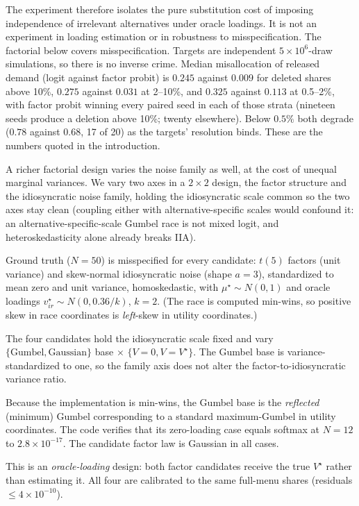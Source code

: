 \documentclass[12pt]{article}
\theoremstyle{remark}
\begin{document}
The experiment
therefore isolates the pure substitution cost of imposing independence
of irrelevant alternatives under oracle loadings. It is not an
experiment in loading estimation or in robustness to misspecification.
The factorial below covers misspecification. Targets are independent
$5\times10^6$-draw simulations, so there is no inverse crime. Median misallocation of
released demand (logit against factor probit) is $0.245$ against
$0.009$ for deleted shares above 10\%, $0.275$ against $0.031$
at 2--10\%, and $0.325$ against $0.113$ at 0.5--2\%, with factor
probit winning every paired seed in each of those strata (nineteen
seeds produce a deletion above 10\%; twenty elsewhere). Below
$0.5\%$ both degrade ($0.78$ against $0.68$, 17 of 20) as the targets'
resolution binds. These are the numbers quoted in the introduction.

A richer factorial design varies the noise family as well, at the cost
of unequal marginal variances. We vary two axes in a
$2\times2$ design, the factor structure and the idiosyncratic noise
family, holding the idiosyncratic scale common so the two axes stay
clean (coupling either with alternative-specific scales would confound
it: an alternative-specific-scale Gumbel race is not mixed logit, and
heteroskedasticity alone already breaks IIA).

Ground truth ($N = 50$) is misspecified for every candidate: $t(5)$ factors
(unit variance) and skew-normal idiosyncratic noise (shape $a = 3$),
standardized to mean zero and unit variance, homoskedastic, with $\mu^\star
\sim N(0,1)$ and oracle loadings $v^\star_{ir} \sim N(0, 0.36/k)$, $k=2$.
(The race is computed min-wins, so positive skew in race coordinates is
\emph{left}-skew in utility coordinates.)

The four candidates hold the idiosyncratic scale fixed and vary
$\{\text{Gumbel}, \text{Gaussian}\}$ base $\times$ $\{V = 0, V =
V^\star\}$. The Gumbel base is variance-standardized to one, so the
family axis does not alter the factor-to-idiosyncratic variance ratio.

Because the implementation is min-wins, the Gumbel base is the
\emph{reflected} (minimum) Gumbel corresponding to a standard
maximum-Gumbel in utility coordinates. The code verifies that
its zero-loading case equals softmax at $N=12$ to $2.8\times10^{-17}$.
The candidate factor law is Gaussian in all cases.

This is an \emph{oracle-loading} design: both factor
candidates receive the true $V^\star$ rather than estimating it. All four
are calibrated to the same full-menu shares (residuals $\le
4\times10^{-10}$).
\end{document}
